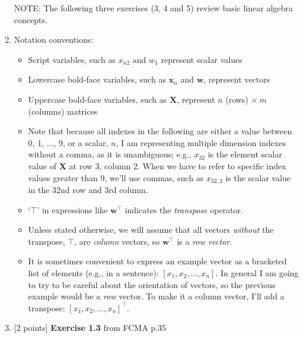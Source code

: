 \documentclass[10pt]{article}
\begin{document}
\begin{enumerate}
\newpage
NOTE: The following three exercises (3, 4 and 5) review basic linear algebra concepts.

\item[] Notation conventions:
\begin{itemize}
\item Script variables, such as $x_{n2}$ and $w_1$ represent scalar values
\item Lowercase bold-face variables, such as $\mathbf{x}_n$ and $\mathbf{w}$, represent vectors
\item Uppercase bold-face variables, such as $\mathbf{X}$, represent $n$ (rows) $\times ~m$ (columns) matrices
\item Note that because all indexes in the following are either a value between 0, 1, ..., 9, or a scalar, $n$, I am representing multiple dimension indexes without a comma, as it is unambiguous; e.g., $x_{32}$ is the element scalar value of $\mathbf{X}$ at row 3, column 2.  When we have to refer to specific index values greater than 9, we'll use commas, such as $x_{32,3}$ is the scalar value in the 32nd row and 3rd column.
\item `$\top$' in expressions like $\mathbf{w}^\top$ indicates the {\em transpose} operator.
\item Unless stated otherwise, we will assume that all vectors {\em without} the transpose, $\top$, are {\em column} vectors, so $\mathbf{w}^\top$ is a {\em row vector}.
\item It is sometimes convenient to express an example vector as a bracketed list of elements (e.g., in a sentence): $[x_1, x_2, ..., x_n]$.  In general I am going to try to be careful about the orientation of vectors, so the previous example would be a {\em row} vector.  To make it a column vector, I'll add a transpose: $[x_1, x_2, ..., x_n]^\top$.
\end{itemize}



\item \label{prob:3} [2 points]
{\bf Exercise 1.3} from FCMA p.35


\end{enumerate}
\end{document}
